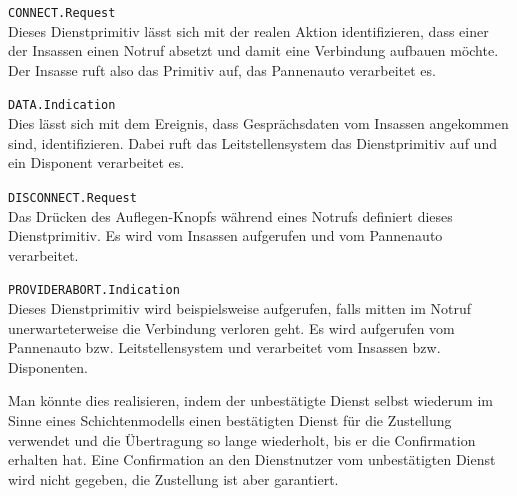\documentclass{../exercisesheet}
\begin{document}
\begin{exercise}{2}
	\begin{subexercise} \texttt{CONNECT.Request}\\
		Dieses Dienstprimitiv lässt sich mit der realen Aktion identifizieren, dass einer der Insassen einen Notruf absetzt und damit eine Verbindung aufbauen möchte. Der
		Insasse ruft also das Primitiv auf, das Pannenauto verarbeitet es.
	\end{subexercise}

	\begin{subexercise} \texttt{DATA.Indication}\\
		Dies lässt sich mit dem Ereignis, dass Gesprächsdaten vom Insassen angekommen sind, identifizieren. Dabei ruft das Leitstellensystem das Dienstprimitiv auf und
		ein Disponent verarbeitet es.
	\end{subexercise}

	\begin{subexercise} \texttt{DISCONNECT.Request}\\
		Das Drücken des Auflegen-Knopfs während eines Notrufs definiert dieses Dienstprimitiv. Es wird vom Insassen aufgerufen und vom Pannenauto verarbeitet.
	\end{subexercise}

	\begin{subexercise} \texttt{PROVIDERABORT.Indication}\\
		Dieses Dienstprimitiv wird beispielsweise aufgerufen, falls mitten im Notruf unerwarteterweise die Verbindung verloren geht. Es wird aufgerufen vom Pannenauto
		bzw. Leitstellensystem und verarbeitet vom Insassen bzw. Disponenten.
	\end{subexercise}
\end{exercise}

\begin{exercise}{1.5}
	Man könnte dies realisieren, indem der unbestätigte Dienst selbst wiederum im Sinne eines Schichtenmodells einen bestätigten Dienst für die Zustellung verwendet und die
	Übertragung so lange wiederholt, bis er die Confirmation erhalten hat. Eine Confirmation an den Dienstnutzer vom unbestätigten Dienst wird nicht gegeben, die Zustellung
	ist aber garantiert.\\
\end{exercise}
\end{document}
